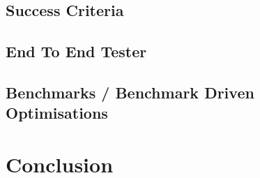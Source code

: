 \documentclass[12pt,twoside,notitlepage]{report}
\begin{document}



\section{Success Criteria}

\section{End To End Tester}

\section{Benchmarks / Benchmark Driven Optimisations}






\clearpage
\chapter{Conclusion}





\clearpage


\printbibliography[title={Bibliography}]
\clearpage
\end{document}
